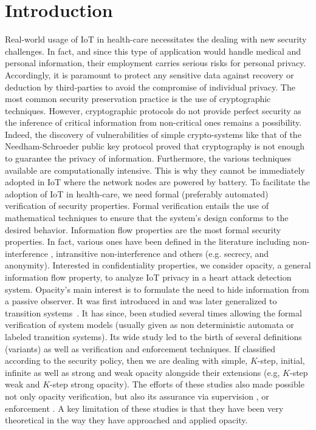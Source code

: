 \section{Introduction}

Real-world usage of IoT in health-care necessitates the dealing with new security challenges. In fact, and since this type of application would handle medical and personal information, their employment carries serious risks for personal privacy. Accordingly, it is paramount to protect any sensitive data against recovery or deduction by third-parties to avoid the compromise of individual privacy. The most common security preservation practice is the use of cryptographic techniques. However, cryptographic protocols do not provide perfect security as the inference of critical information from non-critical ones remains a possibility. Indeed, the discovery of vulnerabilities of simple crypto-systems like that of the Needham-Schroeder public key protocol \cite{lowe1995attack} proved that cryptography is not enough to guarantee the privacy of information. Furthermore, the various techniques available are computationally intensive. This is why they cannot be immediately adopted in IoT where the network nodes are powered by battery. To facilitate the adoption of IoT in health-care, we need formal (preferably automated) verification of security properties. Formal verification entails the use of mathematical techniques to ensure that the system's design conforms to the desired behavior. Information flow properties are the most formal security properties. In fact, various ones have been defined in the literature including non-interference \cite{DBLPM82}, intransitive non-interference \cite{nbha1} and others (e.g. secrecy, and anonymity). Interested in confidentiality properties, we consider opacity, a general information flow property, to analyze IoT privacy in a heart attack detection system. Opacity's main interest is to formulate the need to hide information from a passive observer. It was first introduced in \cite{Mazar} and was later generalized to transition systems~\cite{Bryans2008}. It has since, been studied several times allowing the formal verification of system models (usually given as non deterministic automata or labeled transition systems). Its wide study led to the birth of several definitions (variants) as well as verification and enforcement techniques. If classified according to the security policy, then we are dealing with simple, $K$-step, initial, infinite as well as strong and weak opacity alongside their extensions (e.g, $K$-step weak and $K$-step strong opacity). The efforts of these studies also made possible not only opacity verification, but also its assurance via supervision \cite{Dubrieil2009}, \cite{SabooriH12} or enforcement \cite{Falcone2013}. A key limitation of these studies is that they have been very theoretical in the way they have approached and applied opacity. 

